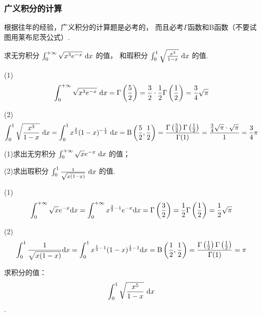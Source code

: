 
\subsubsection{广义积分的计算}

根据往年的经验，广义积分的计算题是必考的，
而且必考$\Gamma$函数和B函数（不要试图用莱布尼茨公式）.

\begin{example}[2022]
\label{ex:ch11-07}
求无穷积分 \( \int_{0}^{+\infty} \sqrt{x^3 e^{-x}} ~\mathrm{d} x \) 的值，
        和瑕积分 \( \int_{0}^{1} \sqrt{\frac{x^3}{1-x}} ~\mathrm{d} x \) 的值.
\end{example}

\begin{solution}
(1)
    \[ \int_{0}^{+\infty} \sqrt{x^3 e^{-x}} ~\mathrm{d} x = \Gamma\left(\frac{5}{2}\right) = \frac{3}{2} \cdot \frac{1}{2} \Gamma\left(\frac{1}{2}\right) = \frac{3}{4} \sqrt{\pi} \]

    (2)
    \[ \int_{0}^{1} \sqrt{\frac{x^3}{1-x}} ~\mathrm{d} x = \int_{0}^{1} x^{\frac{3}{2}} (1-x)^{-\frac{1}{2}} ~\mathrm{d} x = \text{B} \left(\frac{5}{2}, \frac{1}{2}\right) = \frac{\Gamma\left(\frac{5}{2}\right) \Gamma\left(\frac{1}{2}\right)}{\Gamma(1)} = \frac{\frac{3}{4} \sqrt{\pi} \cdot \sqrt{\pi}}{1} = \frac{3}{4} \pi \]
\end{solution}

\begin{example}[2021]
\label{ex:ch11-08}
(1)求出无穷积分 $\int_{0}^{+\infty} \sqrt{x} e^{-x}  ~\mathrm{d} x $ 的值；

(2)求出瑕积分 $\int_{0}^{1} \frac{1}{\sqrt{x(1-x)}}  ~\mathrm{d} x $ 的值.
\end{example}

\begin{solution}
(1)
    \[ \int_{0}^{+\infty} \sqrt{x} e^{-x}  \mathrm{d} x = \int_{0}^{+\infty} x^{\frac{3}{2}-1} e^{-x}  \mathrm{d} x = \Gamma\left(\frac{3}{2}\right) = \frac{1}{2} \Gamma\left(\frac{1}{2}\right) = \frac{1}{2} \sqrt{\pi} \]

    (2)
    \[ \int_{0}^{1} \frac{1}{\sqrt{x(1-x)}}  \mathrm{d} x = \int_{0}^{1} x^{\frac{1}{2}-1}(1-x)^{\frac{1}{2}-1}  \mathrm{d} x = \text{B} \left(\frac{1}{2}, \frac{1}{2}\right)
    = \frac{\Gamma\left(\frac{1}{2}\right) \Gamma\left(\frac{1}{2}\right)}{\Gamma(1)} = \pi \]
\end{solution}

\begin{example}[2024]
\label{ex:ch11-09}
求积分的值： \[ \int_{0}^{1} \sqrt{\frac{x^5}{1-x}}  ~\mathrm{d} x \] .
\end{example}

